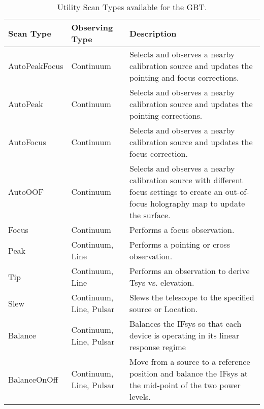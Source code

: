 \begin{table}[!h]
\begin{center}
\caption[Utility Scan Types]{Utility Scan Types available for the \gls{GBT}.
\label{table:utility_scans}}
{\footnotesize
\begin{tabular}{l
                l
                p{}}
\toprule
{\bf Scan Type} & {\bf Observing Type} & {\bf Description} \\
\midrule
AutoPeakFocus & Continuum & Selects and observes a nearby calibration source and 
                            updates the pointing and focus corrections. \\
\cmidrule(lr){1-3}
AutoPeak & Continuum  & Selects and observes a nearby calibration source and 
                        updates the pointing corrections. \\
\cmidrule(lr){1-3}
AutoFocus & Continuum & Selects and observes a nearby calibration source and 
                        updates the focus correction. \\
\cmidrule(lr){1-3}
AutoOOF & Continuum & Selects and observes a nearby calibration source with 
                      different focus settings to create an out-of-focus
                      holography map to update the surface. \\
\cmidrule(lr){1-3}
Focus & Continuum & Performs a focus observation. \\
\cmidrule(lr){1-3}
Peak & Continuum, Line & Performs a pointing or cross observation. \\
\cmidrule(lr){1-3}
Tip & Continuum, Line & Performs an observation to derive \gls{Tsys} vs. elevation. \\
\cmidrule(lr){1-3}
Slew & Continuum, Line, Pulsar & Slews the telescope to the specified source or Location.\\
\cmidrule(lr){1-3}
Balance & Continuum, Line, Pulsar &  Balances the \gls{IFsys} so that each device
                                               is operating in its linear response regime \\
\cmidrule(lr){1-3}
BalanceOnOff & Continuum, Line, Pulsar & Move from a source to a reference position
                                                   and balance the \gls{IFsys} at the
                                                   mid-point of the two power levels.  \\
\bottomrule
\end{tabular}
}
\end{center}
\end{table}


